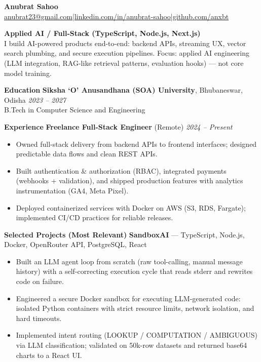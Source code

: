 \documentclass[10pt,a4paper]{article}
\begin{document}
\begin{center}
{\LARGE\bfseries Anubrat Sahoo}\\
\small \href{mailto:anubrat23@gmail.com}{anubrat23@gmail.com}\;|\;\href{https://linkedin.com/in/anubrat-sahoo}{linkedin.com/in/anubrat-sahoo}\;|\;\href{https://github.com/anxbt}{github.com/anxbt}
\end{center}

{\large\bfseries Applied AI / Full-Stack (TypeScript, Node.js, Next.js)}\\
\small I build AI-powered products end-to-end: backend APIs, streaming UX, vector search plumbing, and secure execution pipelines. Focus: applied AI engineering (LLM integration, RAG-like retrieval patterns, evaluation hooks) — not core model training.

\vspace{6pt}
{\large\bfseries Education}
\vspace{2pt}
\textbf{Siksha ‘O’ Anusandhana (SOA) University}, Bhubaneswar, Odisha \hfill \textit{2023 -- 2027}\\
B.Tech in Computer Science and Engineering

\vspace{6pt}
{\large\bfseries Experience}
\vspace{2pt}
\textbf{Freelance Full-Stack Engineer} (Remote) \hfill \textit{2024 -- Present}\\
\begin{itemize}
  \item Owned full-stack delivery from backend APIs to frontend interfaces; designed predictable data flows and clean REST APIs.
  \item Built authentication \& authorization (RBAC), integrated payments (webhooks + validation), and shipped production features with analytics instrumentation (GA4, Meta Pixel).
  \item Deployed containerized services with Docker on AWS (S3, RDS, Fargate); implemented CI/CD practices for reliable releases.
\end{itemize}

\vspace{6pt}
{\large\bfseries Selected Projects (Most Relevant)}
\vspace{2pt}
\textbf{SandboxAI} — TypeScript, Node.js, Docker, OpenRouter API, PostgreSQL, React\\
\begin{itemize}
  \item Built an LLM agent loop from scratch (raw tool-calling, manual message history) with a self-correcting execution cycle that reads stderr and rewrites code on failure.
  \item Engineered a secure Docker sandbox for executing LLM-generated code: isolated Python containers with strict resource limits, network isolation, and hard timeouts.
  \item Implemented intent routing (LOOKUP / COMPUTATION / AMBIGUOUS) via LLM classification; validated on 50k-row datasets and returned base64 charts to a React UI.
\end{itemize}
\end{document}
